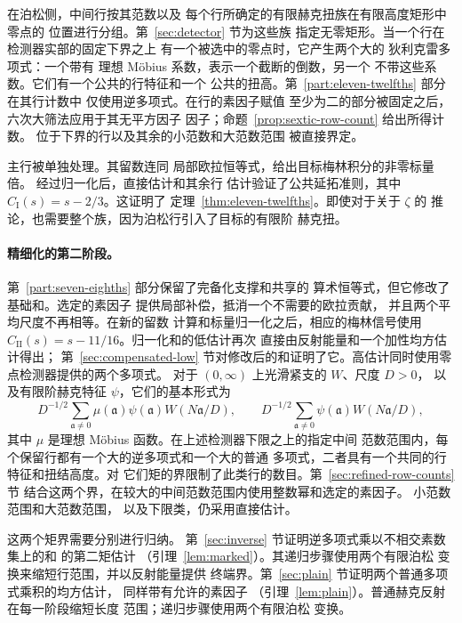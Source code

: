 \documentclass[11pt,a4paper]{article}
\numberwithin{equation}{section}
\numberwithin{figure}{section}
\theoremstyle{definition}
\theoremstyle{remark}
\begin{document}
在泊松侧，中间行按其范数以及
每个行所确定的有限赫克扭族在有限高度矩形中零点的
位置进行分组。第~\ref{sec:detector} 节为这些族
指定无零矩形。当一个行在检测器实部的固定下界之上
有一个被选中的零点时，它产生两个大的
狄利克雷多项式：一个带有
理想 M\"obius 系数，表示一个截断的倒数，另一个
不带这些系数。它们有一个公共的行特征和一个
公共的扭高。第~\ref{part:eleven-twelfths} 部分在其行计数中
仅使用逆多项式。在行的素因子赋值
至少为二的部分被固定之后，六次大筛法应用于其无平方因子
因子；命题~\ref{prop:sextic-row-count} 给出所得计数。
位于下界的行以及其余的小范数和大范数范围
被直接界定。

主行被单独处理。其留数连同
局部欧拉恒等式，给出目标梅林积分的非零标量倍。
经过归一化后，直接估计和其余行
估计验证了公共延拓准则，其中
$C_{\mathrm I}(s)=s-2/3$。这证明了
定理~\ref{thm:eleven-twelfths}。即使对于关于 $\zeta$ 的
推论，也需要整个族，因为泊松行引入了目标的有限阶
赫克扭。

\paragraph{精细化的第二阶段。}
第~\ref{part:seven-eighths} 部分保留了完备化支撑和共享的
算术恒等式，但它修改了基础和。选定的素因子
提供局部补偿，抵消一个不需要的欧拉贡献，
并且两个平均尺度不再相等。在新的留数
计算和标量归一化之后，相应的梅林信号使用
$C_{\mathrm{II}}(s)=s-11/16$。归一化和的低估计再次
直接由反射能量和一个加性均方估计得出；
第~\ref{sec:compensated-low} 节对修改后的和证明了它。高估计同时使用零点检测器提供的两个多项式。
对于 $(0,\infty)$ 上光滑紧支的 $W$、尺度 $D>0$，
以及有限阶赫克特征 $\psi$，它们的基本形式为
\[
 D^{-1/2}\sum_{\mathfrak a\ne0}\mu(\mathfrak a)\psi(\mathfrak a)
       W(N\mathfrak a/D),\qquad
 D^{-1/2}\sum_{\mathfrak a\ne0}\psi(\mathfrak a)W(N\mathfrak a/D),
\]
其中 $\mu$ 是理想 M\"obius 函数。在上述检测器下限之上的指定中间
范数范围内，每个保留行都有一个大的逆多项式和一个大的普通
多项式，二者具有一个共同的行特征和扭结高度。对
它们矩的界限制了此类行的数目。第~\ref{sec:refined-row-counts} 节
结合这两个界，在较大的中间范数范围内使用整数幂和选定的素因子。
小范数范围和大范数范围，
以及下限类，仍采用直接估计。

这两个矩界需要分别进行归纳。
第~\ref{sec:inverse} 节证明逆多项式乘以不相交素数集上的和
的第二矩估计
（引理~\ref{lem:marked}）。其递归步骤使用两个有限泊松
变换来缩短行范围，并以反射能量提供
终端界。第~\ref{sec:plain} 节证明两个普通多项式乘积的均方估计，
同样带有允许的素因子
（引理~\ref{lem:plain}）。普通赫克反射在每一阶段缩短长度
范围；递归步骤使用两个有限泊松
变换。
\end{document}
